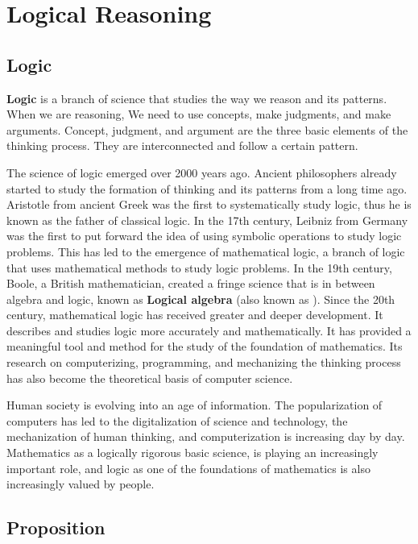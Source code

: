 \documentclass{report}
\begin{document}
\onehalfspacing

\chapter{Logical Reasoning}

\section{Logic}

\textbf{Logic} is a branch of science that studies the way we reason and its patterns. When we are reasoning, We need to use concepts, make judgments, and make arguments. Concept, judgment, and argument are the three basic elements of the thinking process. They are interconnected and follow a certain pattern.

The science of logic emerged over 2000 years ago. Ancient philosophers already
started to study the formation of thinking and its patterns from a long time
ago. Aristotle from ancient Greek was the first to systematically study logic,
thus he is known as the father of classical logic. In the 17th century, Leibniz
from Germany was the first to put forward the idea of using symbolic operations
to study logic problems. This has led to the emergence of mathematical logic, a
branch of logic that uses mathematical methods to study logic problems. In the
19th century, Boole, a British mathematician, created a fringe science that is
in between algebra and logic, known as \textbf{Logical algebra} (also known as
). Since the 20th century, mathematical logic has
received greater and deeper development. It describes and studies logic more
accurately and mathematically. It has provided a meaningful tool and method for
the study of the foundation of mathematics. Its research on computerizing,
programming, and mechanizing the thinking process has also become the
theoretical basis of computer science.

Human society is evolving into an age of information. The popularization of
computers has led to the digitalization of science and technology, the
mechanization of human thinking, and computerization is increasing day by day.
Mathematics as a logically rigorous basic science, is playing an increasingly
important role, and logic as one of the foundations of mathematics is also
increasingly valued by people.

\section{Proposition}
\end{document}
